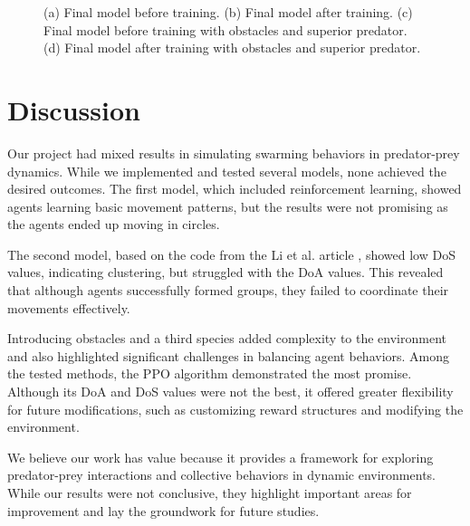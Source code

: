 \documentclass[9pt]{pnas-new}
\begin{document}
\begin{figure}[ht]
		\caption{(a) Final model before training. (b) Final model after training. (c) Final model before training with obstacles and superior predator. (d) Final model after training with obstacles and superior predator. }
		\label{fig:final}
	\end{figure}
	
	
	\section*{Discussion}
	Our project had mixed results in simulating swarming behaviors in predator-prey dynamics. While we implemented and tested several models, none achieved the desired outcomes. The first model, which included reinforcement learning, showed agents learning basic movement patterns, but the results were not promising as the agents ended up moving in circles. 

	The second model, based on the code from the Li et al. article \cite{li2023predator}, showed low DoS values, indicating clustering, but struggled with the DoA values. This revealed that although agents successfully formed groups, they failed to coordinate their movements effectively. 

	Introducing obstacles and a third species added complexity to the environment and also highlighted significant challenges in balancing agent behaviors. Among the tested methods, the PPO algorithm demonstrated the most promise. Although its DoA and DoS values were not the best, it offered greater flexibility for future modifications, such as customizing reward structures and modifying the environment.

	We believe our work has value because it provides a framework for exploring predator-prey interactions and collective behaviors in dynamic environments. While our results were not conclusive, they highlight important areas for improvement and lay the groundwork for future studies.
	
	\showacknow %
	
	
	\begin{multicols}{2}
	\end{multicols}
	
	
\end{document}
